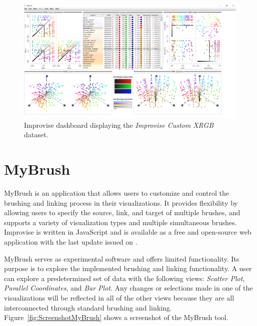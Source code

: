 \begin{figure}[tp]
\centering
\includegraphics[keepaspectratio,width=\linewidth,height=\halfh, frame]
{images/screenshot-improvise.png}

\caption[Improvise Dashboard]
{%
Improvise dashboard displaying the \emph{Improvise Custom XRGB} dataset.
}
\label{fig:ScreenshotImprovise}
\end{figure}




\section{MyBrush}

MyBrush \parencite{koytek2017mybrush} is an application that allows users
to customize and control the brushing and linking process in their
visualizations. It provides flexibility by allowing users to specify the
source, link, and target of multiple brushes, and supports a variety of
visualization types and multiple simultaneous brushes. Improvise is
written in JavaScript and is available as a free and open-source web
application with the last update issued on .

MyBrush serves as experimental software and offers limited functionality.
Its purpose is to explore the implemented brushing and linking
functionality.  A user can explore a predetermined set of data with the
following views: \emph{Scatter Plot}, \emph{Parallel Coordinates}, and
\emph{Bar Plot}. Any changes or selections made in one of the
visualizations will be reflected in all of the other views because they
are all interconnected through standard brushing and linking.
Figure~\ref{fig:ScreenshotMyBrush} shows a screenshot of the MyBrush tool.




